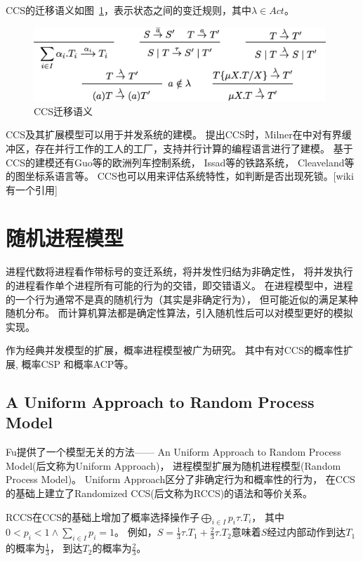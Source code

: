    CCS的迁移语义如图~\ref{fig_ccs}，表示状态之间的变迁规则，其中$\lambda \in Act$。

   \begin{figure}[!htbp]
    \small
    \centering
    \includegraphics[width=11cm]{../figure/ccs.png}
    \caption[]{CCS迁移语义}
     \label{fig_ccs}
 \end{figure}

   CCS及其扩展模型可以用于并发系统的建模。
   提出CCS时，Milner在\cite{2}中对有界缓冲区，存在并行工作的工人的工厂，支持并行计算的编程语言进行了建模。
   基于CCS的建模还有Guo等的欧洲列车控制系统\cite{16}，
   Issad等的铁路系统\cite{17}，
   Cleaveland等的图坐标系语言\cite{18}等。
   CCS也可以用来评估系统特性，如判断是否出现死锁。[wiki有一个引用]
   \section{随机进程模型}

   进程代数将进程看作带标号的变迁系统，将并发性归结为非确定性，
   将并发执行的进程看作单个进程所有可能的行为的交错，即交错语义。
   在进程模型中，进程的一个行为通常不是真的随机行为（其实是非确定行为），
   但可能近似的满足某种随机分布。
   而计算机算法都是确定性算法，引入随机性后可以对模型更好的模拟实现。

   作为经典并发模型的扩展，概率进程模型被广为研究。
   其中有对CCS的概率性扩展\cite{9,10},
   概率CSP\cite{11} 和概率ACP\cite{12}等。

   \subsection{A Uniform Approach to Random Process Model}
   Fu提供了一个模型无关的方法—— An Uniform Approach to Random Process Model(后文称为Uniform Approach)，
   进程模型扩展为随机进程模型(Random Process Model)。
   Uniform Approach区分了非确定行为和概率性的行为，
   在CCS的基础上建立了Randomized CCS(后文称为RCCS)的语法和等价关系。

   RCCS在CCS的基础上增加了概率选择操作子$\bigoplus_{i\in I}p_i\tau.T_i$，
   其中$0<p_i<1 \wedge \sum_{i\in I}p_i = 1$。
   例如，$S=\frac{1}{3}\tau.T_1+\frac{2}{3}\tau.T_2$意味着$S$经过内部动作到达$T_1$的概率为$\frac{1}{3}$，
   到达$T_2$的概率为$\frac{2}{3}$。

